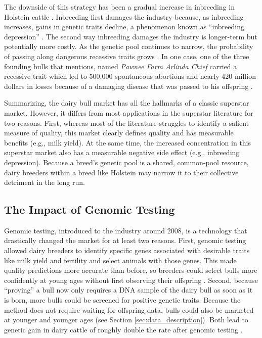 \documentclass[12pt,letterpaper]{article}
\begin{document}
The downside of this strategy has been a gradual increase in inbreeding in Holstein cattle \citep{young1996estimates}. Inbreeding first damages the industry because, as inbreeding increases, gains in genetic traits decline, a phenomenon known as ``inbreeding depression'' \citep{charlesworth2009genetics}. The second way inbreeding damages the industry is longer-term but potentially more costly. As the genetic pool continues to narrow, the probability of passing along dangerous recessive traits grows \citep{charlesworth2009genetics}. In one case, one of the three founding bulls that \citet{Yue2015} mentions, named \textit{Pawnee Farm Arlinda Chief} carried a recessive trait which led to 500,000 spontaneous abortions and nearly 420 million dollars in losses because of a damaging disease that was passed to his offspring \citep{Adams2016}.

Summarizing, the dairy bull market has all the hallmarks of a classic superstar market. However, it differs from most applications in the superstar literature for two reasons. First, whereas most of the literature struggles to identify a salient measure of quality, this market clearly defines quality and has measurable benefits (e.g., milk yield). At the same time, the increased concentration in this superstar market also has a measurable negative side effect (e.g., inbreeding depression). Because a breed's genetic pool is a shared, common-pool resource, dairy breeders within a breed like Holstein may narrow it to their collective detriment in the long run.

\subsection{The Impact of Genomic Testing}
Genomic testing, introduced to the industry around 2008, is a technology that drastically changed the market for at least two reasons. First, genomic testing allowed dairy breeders to identify specific genes associated with desirable traits like milk yield and fertility and select animals with those genes. This made quality predictions more accurate than before, so breeders could select bulls more confidently at young ages without first observing their offspring \citep{vanraden2009invited}. Second, because ``proving'' a bull now only requires a DNA sample of the dairy bull as soon as it is born, more bulls could be screened for positive genetic traits. Because the method does not require waiting for offspring data, bulls could also be marketed at younger and younger ages (see Section \ref{sec:data_description}). Both lead to genetic gain in dairy cattle of roughly double the rate after genomic testing \citep{garciaruiz2016}.
\end{document}
